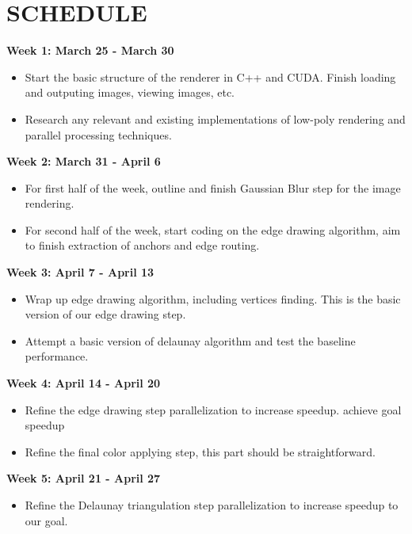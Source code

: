 \documentclass[12pt]{article}
\theoremstyle{definition}
\theoremstyle{plain}
\begin{document}
\section{SCHEDULE}

{\bf Week 1: March 25 - March 30}
\begin{itemize}
\item Start the basic structure of the renderer in C++ and CUDA. 
Finish loading and outputing images, viewing images, etc. 
\item Research any relevant and existing implementations of low-poly rendering 
and parallel processing techniques. 
\end{itemize}

{\bf Week 2: March 31 - April 6}
\begin{itemize}
\item For first half of the week, outline and finish Gaussian Blur step for the
image rendering. 
\item For second half of the week, start coding on the edge drawing algorithm, 
aim to finish extraction of anchors and edge routing. 
\end{itemize}

{\bf Week 3: April 7 - April 13}
\begin{itemize}
\item Wrap up edge drawing algorithm, including vertices finding. This is the 
basic version of our edge drawing step.
\item Attempt a basic version of delaunay algorithm and test the baseline
performance.
\end{itemize}

{\bf Week 4: April 14 - April 20}
\begin{itemize}
\item Refine the edge drawing step parallelization to increase speedup. 
{\color{red} achieve goal speedup}
\item Refine the final color applying step, this part should be straightforward.
\end{itemize}

{\bf Week 5: April 21 - April 27}
\begin{itemize}
\item Refine the Delaunay triangulation step parallelization to increase speedup
to our goal. 
\end{itemize}
\end{document}
